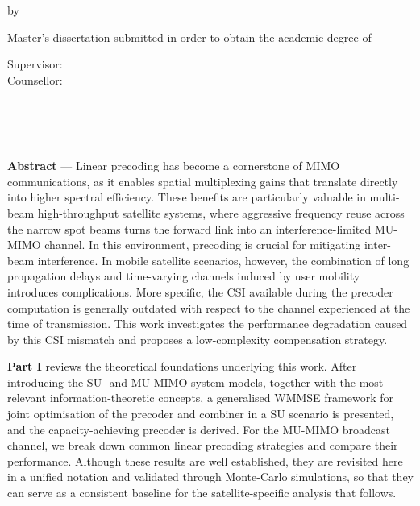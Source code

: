 \cleardoublepage
{}


\begin{center}
    {\Large \textbf{\thesistitle}} \vspace{0.2cm}

    {\large by} \\
    \textsc{\authorname} \vspace{0.2cm}

    Master's dissertation submitted in order to obtain the academic degree of \degree \par\vspace{0.4cm}

    Supervisor: \supervisor \\
    Counsellor: \counsellor \vspace{0.4cm}

    \university \\
    \faculty \\
    \department \\
\end{center}

\vspace{0.6cm}

\noindent\textbf{Abstract} ---
Linear precoding has become a cornerstone of \acs*{MIMO} communications, as it enables spatial multiplexing gains that translate directly into higher spectral efficiency.
These benefits are particularly valuable in multi-beam high-throughput satellite systems, where aggressive frequency reuse across the narrow spot beams turns the forward link into an interference-limited \acs*{MU}-\acs*{MIMO} channel. 
In this environment, precoding is crucial for mitigating inter-beam interference.
In mobile satellite scenarios, however, the combination of long propagation delays and time-varying channels induced by user mobility introduces complications.
More specific, the \ac*{CSI} available during the precoder computation is generally outdated with respect to the channel experienced at the time of transmission.
This work investigates the performance degradation caused by this \acs*{CSI} mismatch and proposes a low-complexity compensation strategy.

\textbf{Part I} reviews the theoretical foundations underlying this work. 
After introducing the \acs*{SU}- and \acs*{MU}-\acs*{MIMO} system models, together with the most relevant information-theoretic concepts, a generalised \acs*{WMMSE} framework for joint optimisation of the precoder and combiner in a \acs*{SU} scenario is presented, and the capacity-achieving precoder is derived.
For the \acs*{MU}-\acs*{MIMO} broadcast channel, we break down common linear precoding strategies and compare their performance.
Although these results are well established, they are revisited here in a unified notation and validated through Monte-Carlo simulations, so that they can serve as a consistent baseline for the satellite-specific analysis that follows.

